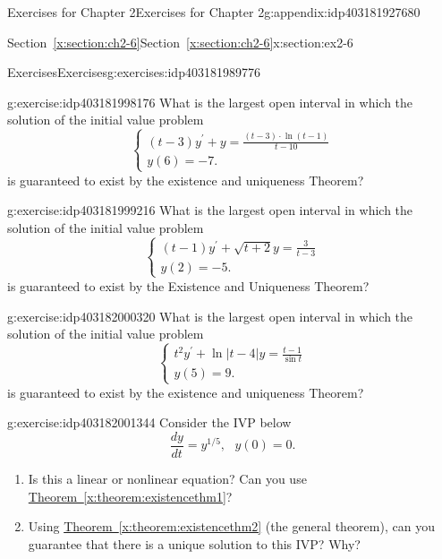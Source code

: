 \documentclass[oneside,10pt,]{book}
\newcommand{\xreffont}{\relax}
\numberwithin{equation}{section}
\numberwithin{equation}{section}
\begin{document}
\begin{appendixptx}{Exercises for Chapter 2}{}{Exercises for Chapter 2}{}{}{g:appendix:idp403181927680}
\begin{sectionptx}{Section~{\xreffont\ref*{x:section:ch2-6}}}{}{Section~{\xreffont\ref*{x:section:ch2-6}}}{}{}{x:section:ex2-6}
\begin{exercises-subsection-numberless}{Exercises}{}{Exercises}{}{}{g:exercises:idp403181989776}
\begin{divisionexercise}{2}{}{}{g:exercise:idp403181998176}
What is the largest open interval in which the solution of the initial value problem%
\begin{equation*}
\begin{cases}
\left(t-3\right)y^{\prime}+y=\frac{\left(t-3\right)\cdot\ln\left(t-1\right)}{t-10}\\
y(6)=-7.
\end{cases}
\end{equation*}
is guaranteed to exist by the existence and uniqueness Theorem?%
\end{divisionexercise}%
\begin{divisionexercise}{3}{}{}{g:exercise:idp403181999216}%
What is the largest open interval in which the solution of the initial value problem%
\begin{equation*}
\begin{cases}
\left(t-1\right)y^{\prime}+\sqrt{t+2}y=\frac{3}{t-3}\\
y(2)=-5.
\end{cases}
\end{equation*}
is guaranteed to exist by the Existence and Uniqueness Theorem?%
\end{divisionexercise}%
\begin{divisionexercise}{4}{}{}{g:exercise:idp403182000320}%
What is the largest open interval in which the solution of the initial value problem%
\begin{equation*}
\begin{cases}
t^{2}y^{\prime}+\ln\left|t-4\right|y=\frac{t-1}{\sin t}\\
y(5)=9.
\end{cases}
\end{equation*}
is guaranteed to exist by the existence and uniqueness Theorem?%
\end{divisionexercise}%
\begin{divisionexercise}{5}{}{}{g:exercise:idp403182001344}%
Consider the IVP below%
\begin{equation*}
\frac{dy}{dt}=y^{1/5},\,\,\,\,y(0)=0.
\end{equation*}
%
%
\begin{enumerate}[label=(\alph*)]
\item{}Is this a linear or nonlinear equation? Can you use \hyperref[x:theorem:existencethm1]{Theorem~{\xreffont\ref{x:theorem:existencethm1}}}?%
\item{}Using \hyperref[x:theorem:existencethm2]{Theorem~{\xreffont\ref{x:theorem:existencethm2}}} (the general theorem), can you guarantee that there is a unique solution to this IVP? Why?%

\end{enumerate}
\end{divisionexercise}
\end{exercises-subsection-numberless}
\end{sectionptx}
\end{appendixptx}
\end{document}
